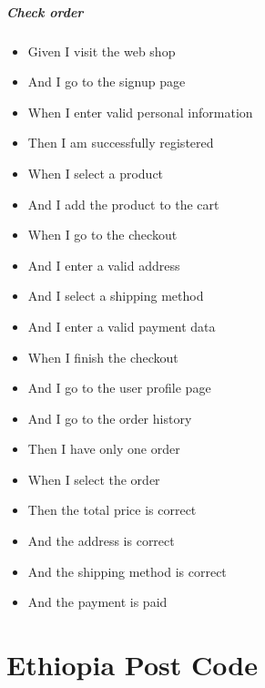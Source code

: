 \begin{appendices}
\paragraph{Check order}
\begin{itemize}
	\item Given I visit the web shop	
	\item And I go to the signup page
	\item When I enter valid personal information
	\item Then I am successfully registered
	\item When I select a product
	\item And I add the product to the cart
	\item When I go to the checkout
	\item And I enter a valid address
	\item And I select a shipping method
	\item And I enter a valid payment data
	\item When I finish the checkout
	\item And I go to the user profile page
	\item And I go to the order history
	\item Then I have only one order
	\item When I select the order
	\item Then the total price is correct
	\item And the address is correct
	\item And the shipping method is correct
	\item And the payment is paid
\end{itemize}

\chapter{Ethiopia Post Code}

\end{appendices}
